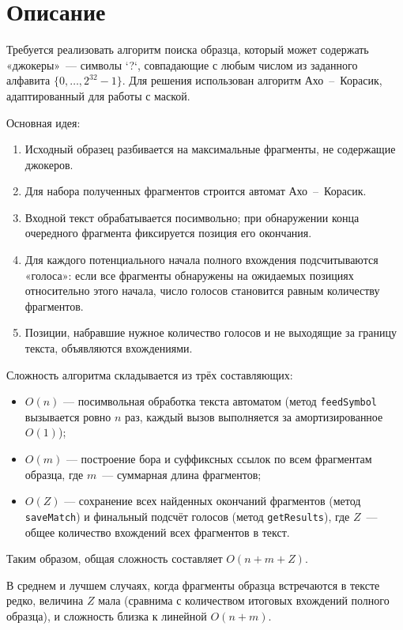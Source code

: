 \section{Описание}
Требуется реализовать алгоритм поиска образца, который может содержать
«джокеры»~--- символы `?`, совпадающие с любым числом из заданного
алфавита $\{0,\dots,2^{32}-1\}$. Для решения использован алгоритм
Ахо~--~Корасик, адаптированный для работы с маской.

Основная идея:
\begin{enumerate}
  \item Исходный образец разбивается на максимальные фрагменты,
        не содержащие джокеров.
  \item Для набора полученных фрагментов строится автомат
        Ахо~--~Корасик.
  \item Входной текст обрабатывается посимвольно; при обнаружении
        конца очередного фрагмента фиксируется позиция его окончания.
  \item Для каждого потенциального начала полного вхождения
        подсчитываются «голоса»: если все фрагменты обнаружены
        на ожидаемых позициях относительно этого начала, число голосов
        становится равным количеству фрагментов.
  \item Позиции, набравшие нужное количество голосов и не выходящие
        за границу текста, объявляются вхождениями.
\end{enumerate}

Сложность алгоритма складывается из трёх составляющих:
\begin{itemize}
  \item $O(n)$ --- посимвольная обработка текста автоматом (метод
        \texttt{feedSymbol} вызывается ровно $n$ раз, каждый вызов
        выполняется за амортизированное $O(1)$);
  \item $O(m)$ --- построение бора и суффиксных ссылок по всем
        фрагментам образца, где $m$~--- суммарная длина фрагментов;
  \item $O(Z)$ --- сохранение всех найденных окончаний фрагментов
        (метод \texttt{saveMatch}) и финальный подсчёт голосов
        (метод \texttt{getResults}), где $Z$~--- общее количество
        вхождений всех фрагментов в текст.
\end{itemize}

Таким образом, общая сложность составляет $O(n + m + Z)$.

В среднем и лучшем случаях, когда фрагменты образца встречаются в
тексте редко, величина $Z$ мала (сравнима с количеством итоговых
вхождений полного образца), и сложность близка к линейной $O(n + m)$.

